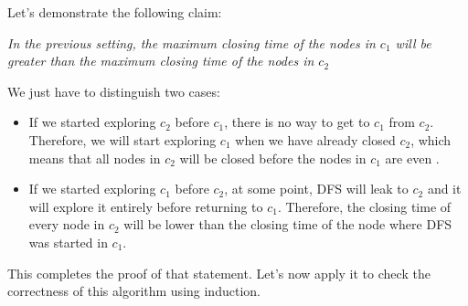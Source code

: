 Let's demonstrate the following claim: 
\vspace{-5pt}
\begin{center}
	\itshape
	In the previous setting, the maximum closing time of the nodes in $c_1$ will
	be greater than the maximum closing time of the nodes in $c_2$
\end{center}
We just have to distinguish two cases:
\begin{itemize}
	\item
	If we started exploring $c_2$ before $c_1$, there is no way to get to $c_1$ from
	$c_2$. Therefore, we will start exploring $c_1$ when we have already closed $c_2$,
	which means that all nodes in $c_2$ will be closed before the nodes in $c_1$
	are even .
	\item
	If we started exploring $c_1$ before $c_2$, at some point, DFS will leak to 
	$c_2$ and it will explore it entirely before returning to $c_1$. Therefore,
	the closing time of every node in $c_2$ will be lower than the closing time
	of the node where DFS was started in $c_1$.
\end{itemize}
This completes the proof of that statement. Let's now apply it to check the correctness 
of this algorithm using induction. 

